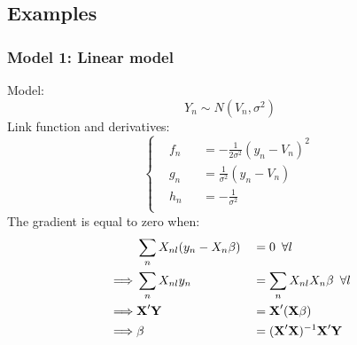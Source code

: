 \documentclass[12pt]{article}
\begin{document}
\subsection{Examples}
\subsubsection{Model 1: Linear model}
Model:
\begin{equation}
	Y_n \sim N(V_n, \sigma^2)
\end{equation}
Link function and derivatives:
\begin{equation}
\left\{ \begin{aligned}
	& f_n && = -\frac{1}{2 \sigma^2} (y_n -V_n)^2 \ \\
	& g_n && =  \frac{1}{\sigma^2} (y_n -V_n) \\
	& h_n && =  -\frac{1}{\sigma^2} \\
\end{aligned} \right.
\end{equation}
The gradient is equal to zero when:
\begin{equation}
\begin{aligned}
	&\sum_n X_{nl} (y_n - X_n \beta) && = 0 \hspace*{5pt} \forall l  \\
	\implies & \sum_n X_{nl} y_n && = \sum_n X_{nl} X_n \beta \hspace*{5pt} \forall l  \\
	\implies & \textbf{X}' \textbf{Y} && = \textbf{X}'(\textbf{X} \beta) \\
	\implies & \beta && =  (\textbf{X}'\textbf{X})^{-1} \textbf{X}' \textbf{Y} \\
\end{aligned}
\end{equation}
\end{document}
